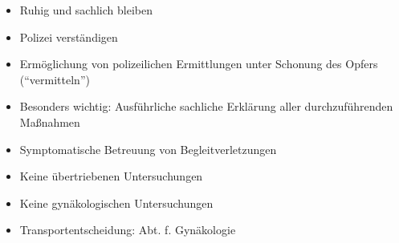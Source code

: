 \label{m:vergewaltigung}
\begin{itemize}
  \item Ruhig und sachlich bleiben
  \item Polizei verständigen
  \item Ermöglichung von polizeilichen Ermittlungen unter Schonung
  des Opfers (\enquote{vermitteln})
  \item Besonders wichtig: Ausführliche sachliche Erklärung
  aller durchzuführenden Maßnahmen
  \item Symptomatische Betreuung von Begleitverletzungen
  \item Keine übertriebenen Untersuchungen
  \item Keine gynäkologischen Untersuchungen
  \item Transportentscheidung: Abt. f. Gynäkologie
\end{itemize}